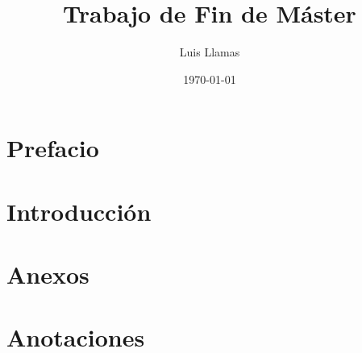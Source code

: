 \documentclass[12pt, a4paper]{book}
\begin{document}
\frontmatter
\title{Trabajo de Fin de Máster}
\author{Luis Llamas}
\date{\today}
\maketitle

\tableofcontents

\chapter{Prefacio}

\mainmatter
\chapter{Introducción}

\lipsum[1-20]

\appendix
\chapter{Anexos}

\backmatter
\chapter{Anotaciones}
\end{document}
